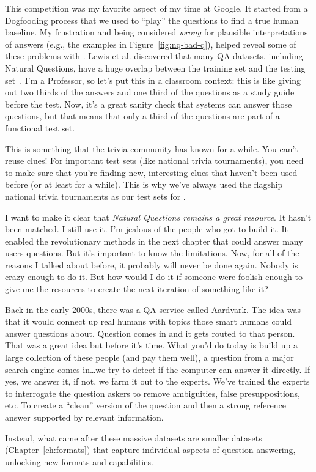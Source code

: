 This competition was my favorite aspect of my time at Google.
%
It started from a Dogfooding process that we used to ``play'' the
 questions to find a true human baseline.
%
My frustration and being considered \emph{wrong} for plausible
interpretations of answers (e.g., the examples in
Figure~\ref{fig:nq-bad-q}), helped reveal some of these problems with
.
%
Lewis et al. discovered that many QA datasets, including Natural
Questions, have a huge overlap between the training set and the
testing set~\citep{lewis-21}.
%
I’m a Professor, so let’s put this in a classroom context: this is
like giving out two thirds of the answers and one third of the
questions as a study guide before the test.
%
Now, it’s a great sanity check that systems can answer those
questions, but that means that only a third of the questions are part
of a functional test set.

This is something that the trivia community has known for a while.  
%
You can’t reuse clues!  For important test sets (like national trivia
tournaments), you need to make sure that you’re finding new,
interesting clues that haven’t been used before (or at least for a
while).
%
This is why we’ve always used the flagship national trivia tournaments
as our test sets for \quizbowl{}.

I want to make it clear that \emph{Natural Questions remains a great
  resource}.  It hasn’t been matched.  I still use it.  I’m jealous of
the people who got to build it.
%
It enabled the revolutionary methods in the next chapter that could
answer many users questions.
%
But it’s important to know the limitations.
%
Now, for all of the reasons I talked about before, it probably will
never be done again.  Nobody is crazy enough to do it.
%
But how would I do it if someone were foolish enough to give me the
resources to create the next iteration of something like it?

Back in the early 2000s, there was a QA service called Aardvark.  
%
The idea was that it would connect up real humans with topics those
smart humans could answer questions about.  Question comes in and it
gets routed to that person.
%
That was a great idea but before it’s time.
%
What you’d do today is build up a large collection of these people
(and pay them well), a question from a major search engine comes
in\dots we try to detect if the computer can answer it directly.
%
If yes, we answer it, if not, we farm it out to the experts.  We’ve
trained the experts to interrogate the question askers to remove
ambiguities, false presuppositions, etc.
%
To create a ``clean'' version of the question and then a strong
reference answer supported by relevant information.

Instead, what came after these massive datasets are smaller datasets
(Chapter~\ref{ch:formats}) that capture individual aspects of question
answering, unlocking new formats and capabilities.
